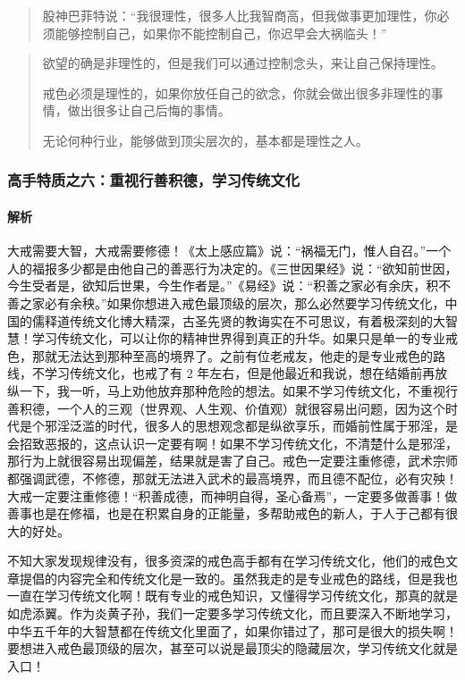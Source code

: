 \documentclass{ctexart}
\begin{document}
\begin{quote}
    股神巴菲特说：“我很理性，很多人比我智商高，但我做事更加理性，你必须能够控制自己，如果你不能控制自己，你迟早会大祸临头！”
\end{quote}

\begin{quotation}
    欲望的确是非理性的，但是我们可以通过控制念头，来让自己保持理性。

    戒色必须是理性的，如果你放任自己的欲念，你就会做出很多非理性的事情，做出很多让自己后悔的事情。

    无论何种行业，能够做到顶尖层次的，基本都是理性之人。
\end{quotation}

\subsubsection{高手特质之六：重视行善积德，学习传统文化}

\paragraph{解析} 大戒需要大智，大戒需要修德！《太上感应篇》说：“祸福无门，惟人自召。”一个人的福报多少都是由他自己的善恶行为决定的。《三世因果经》说：“欲知前世因，今生受者是，欲知后世果，今生作者是。”《易经》说：“积善之家必有余庆，积不善之家必有余秧。”如果你想进入戒色最顶级的层次，那么必然要学习传统文化，中国的儒释道传统文化博大精深，古圣先贤的教诲实在不可思议，有着极深刻的大智慧！学习传统文化，可以让你的精神世界得到真正的升华。如果只是单一的专业戒色，那就无法达到那种至高的境界了。之前有位老戒友，他走的是专业戒色的路线，不学习传统文化，也戒了有 2 年左右，但是他最近和我说，想在结婚前再放纵一下，我一听，马上劝他放弃那种危险的想法。如果不学习传统文化，不重视行善积德，一个人的三观（世界观、人生观、价值观）就很容易出问题，因为这个时代是个邪淫泛滥的时代，很多人的思想观念都是纵欲享乐，而婚前性属于邪淫，是会招致恶报的，这点认识一定要有啊！如果不学习传统文化，不清楚什么是邪淫，那行为上就很容易出现偏差，结果就是害了自己。戒色一定要注重修德，武术宗师都强调武德，不修德，那就无法进入武术的最高境界，而且德不配位，必有灾殃！大戒一定要注重修德！“积善成德，而神明自得，圣心备焉”，一定要多做善事！做善事也是在修福，也是在积累自身的正能量，多帮助戒色的新人，于人于己都有很大的好处。

不知大家发现规律没有，很多资深的戒色高手都有在学习传统文化，他们的戒色文章提倡的内容完全和传统文化是一致的。虽然我走的是专业戒色的路线，但是我也一直在学习传统文化啊！既有专业的戒色知识，又懂得学习传统文化，那真的就是如虎添翼。作为炎黄子孙，我们一定要多学习传统文化，而且要深入不断地学习，中华五千年的大智慧都在传统文化里面了，如果你错过了，那可是很大的损失啊！要想进入戒色最顶级的层次，甚至可以说是最顶尖的隐藏层次，学习传统文化就是入口！
\end{document}
